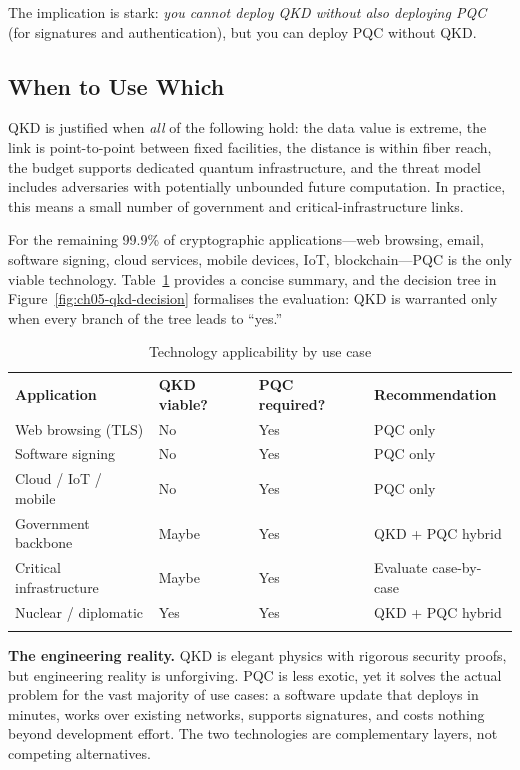 The implication is stark: \emph{you cannot deploy QKD without also deploying PQC} (for signatures and authentication), but you can deploy PQC without QKD.

\subsection{When to Use Which}
\label{subsec:qkd-use-cases}

QKD is justified when \emph{all} of the following hold: the data value is extreme, the link is point-to-point between fixed facilities, the distance is within fiber reach, the budget supports dedicated quantum infrastructure, and the threat model includes adversaries with potentially unbounded future computation.  In practice, this means a small number of government and critical-infrastructure links.

For the remaining 99.9\% of cryptographic applications---web browsing, email, software signing, cloud services, mobile devices, IoT, blockchain---PQC is the only viable technology.  Table~\ref{tab:qkd-pqc-use} provides a concise summary, and the decision tree in Figure~\ref{fig:ch05-qkd-decision} formalises the evaluation: QKD is warranted only when every branch of the tree leads to ``yes.''

\begin{table}[t]
\caption{Technology applicability by use case}
\label{tab:qkd-pqc-use}
\begin{tabular}{p{4cm}p{2cm}p{2cm}p{3.5cm}}
\hline\noalign{\smallskip}
\textbf{Application} & \textbf{QKD viable?} & \textbf{PQC required?} & \textbf{Recommendation} \\
\noalign{\smallskip}\svhline\noalign{\smallskip}
Web browsing (TLS)        & No    & Yes & PQC only \\
Software signing          & No    & Yes & PQC only \\
Cloud / IoT / mobile      & No    & Yes & PQC only \\
Government backbone       & Maybe & Yes & QKD + PQC hybrid \\
Critical infrastructure   & Maybe & Yes & Evaluate case-by-case \\
Nuclear / diplomatic      & Yes   & Yes & QKD + PQC hybrid \\
\noalign{\smallskip}\hline
\end{tabular}
\end{table}

\begin{svgraybox}
\textbf{The engineering reality.}
QKD is elegant physics with rigorous security proofs, but engineering reality is unforgiving.  PQC is less exotic, yet it solves the actual problem for the vast majority of use cases: a software update that deploys in minutes, works over existing networks, supports signatures, and costs nothing beyond development effort.  The two technologies are complementary layers, not competing alternatives.
\end{svgraybox}

